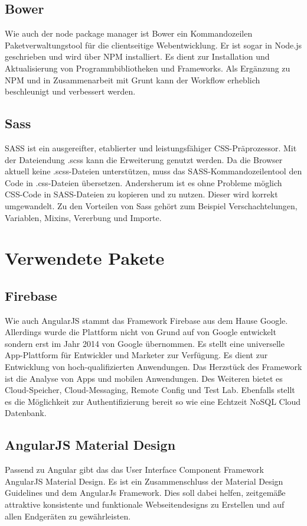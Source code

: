 \subsection{Bower}
Wie auch der node package manager ist Bower ein Kommandozeilen Paketverwaltungstool für die clientseitige Webentwicklung. Er ist sogar in Node.js geschrieben und wird über NPM installiert. Es dient zur Installation und Aktualisierung von Programmbibliotheken und Frameworks. Als Ergänzung zu NPM und in Zusammenarbeit mit Grunt kann der Workflow erheblich beschleunigt und verbessert werden. 

\subsection{Sass}
SASS ist ein ausgereifter, etablierter und leistungsfähiger CSS-Präprozessor. Mit der Dateiendung .scss kann die Erweiterung genutzt werden. Da die Browser aktuell keine .scss-Dateien unterstützen, muss das SASS-Kommandozeilentool den Code in .css-Dateien übersetzen.  Andersherum ist es ohne Probleme möglich CSS-Code in SASS-Dateien zu kopieren und zu nutzen. Dieser wird korrekt umgewandelt. Zu den Vorteilen von Sass gehört zum Beispiel Verschachtelungen, Variablen, Mixins, Vererbung und Importe.



\section{Verwendete Pakete}
\subsection{Firebase}
Wie auch AngularJS stammt das Framework Firebase aus dem Hause Google. Allerdings wurde die Plattform nicht von Grund auf von Google entwickelt sondern erst im Jahr 2014 von Google übernommen. Es stellt eine universelle App-Plattform für Entwickler und Marketer zur Verfügung. Es dient zur Entwicklung von hoch-qualifizierten Anwendungen. Das Herzstück des Framework ist die Analyse von Apps und mobilen Anwendungen. Des Weiteren bietet es Cloud-Speicher, Cloud-Messaging, Remote Config und Test Lab. Ebenfalls stellt es die Möglichkeit zur Authentifizierung bereit so wie eine Echtzeit NoSQL Cloud Datenbank. 

\subsection{AngularJS Material Design}
Passend zu Angular gibt das das User Interface Component Framework AngularJS Material Design. Es ist ein Zusammenschluss der Material Design Guidelines und dem AngularJs Framework. Dies soll dabei helfen, zeitgemäße attraktive konsistente und funktionale  Webseitendesigns zu Erstellen und auf allen Endgeräten zu gewährleisten.

